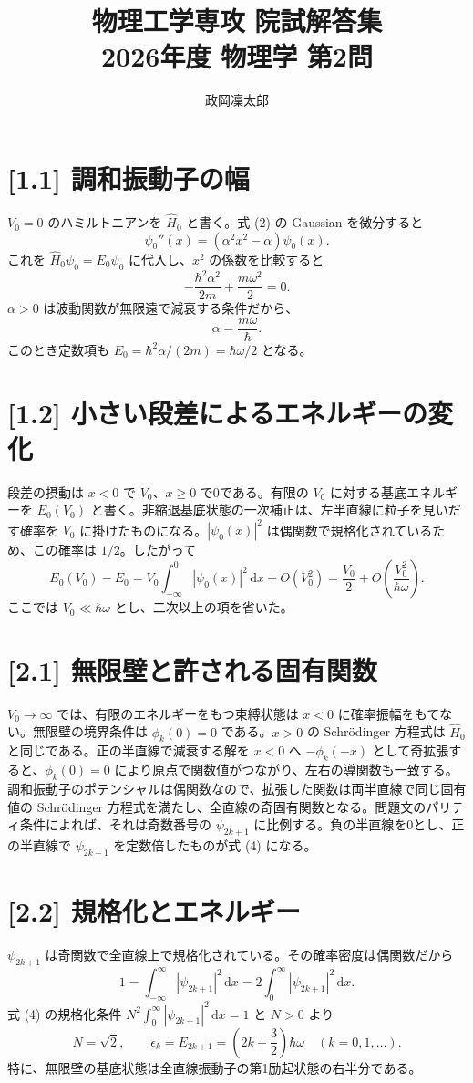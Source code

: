 \documentclass[11pt,a4paper]{article}
\title{物理工学専攻 院試解答集\\2026年度 物理学 第2問}
\author{政岡凜太郎}
\date{}
\begin{document}
\maketitle

\section*{[1.1] 調和振動子の幅}
$V_0=0$ のハミルトニアンを $\hat H_0$ と書く。式 (2) の Gaussian を微分すると
\[
\psi_0''(x)=(\alpha^2x^2-\alpha)\psi_0(x).
\]
これを $\hat H_0\psi_0=E_0\psi_0$ に代入し、$x^2$ の係数を比較すると
\[
-\frac{\hbar^2\alpha^2}{2m}+\frac{m\omega^2}{2}=0.
\]
$\alpha>0$ は波動関数が無限遠で減衰する条件だから、
\[
\boxed{\alpha=\frac{m\omega}{\hbar}}.
\]
このとき定数項も $E_0=\hbar^2\alpha/(2m)=\hbar\omega/2$ となる。

\section*{[1.2] 小さい段差によるエネルギーの変化}
段差の摂動は $x<0$ で $V_0$、$x\geq0$ で0である。有限の $V_0$ に対する基底エネルギーを $E_0(V_0)$ と書く。非縮退基底状態の一次補正は、左半直線に粒子を見いだす確率を $V_0$ に掛けたものになる。$|\psi_0(x)|^2$ は偶関数で規格化されているため、この確率は $1/2$。したがって
\[
\boxed{E_0(V_0)-E_0
=V_0\int_{-\infty}^{0}|\psi_0(x)|^2\,\mathrm dx+O(V_0^2)
=\frac{V_0}{2}+O\!\left(\frac{V_0^2}{\hbar\omega}\right)}.
\]
ここでは $V_0\ll\hbar\omega$ とし、二次以上の項を省いた。

\section*{[2.1] 無限壁と許される固有関数}
$V_0\to\infty$ では、有限のエネルギーをもつ束縛状態は $x<0$ に確率振幅をもてない。無限壁の境界条件は $\phi_k(0)=0$ である。$x>0$ の Schrödinger 方程式は $\hat H_0$ と同じである。正の半直線で減衰する解を $x<0$ へ $-\phi_k(-x)$ として奇拡張すると、$\phi_k(0)=0$ により原点で関数値がつながり、左右の導関数も一致する。調和振動子のポテンシャルは偶関数なので、拡張した関数は両半直線で同じ固有値の Schrödinger 方程式を満たし、全直線の奇固有関数となる。問題文のパリティ条件によれば、それは奇数番号の $\psi_{2k+1}$ に比例する。負の半直線を0とし、正の半直線で $\psi_{2k+1}$ を定数倍したものが式 (4) になる。

\section*{[2.2] 規格化とエネルギー}
$\psi_{2k+1}$ は奇関数で全直線上で規格化されている。その確率密度は偶関数だから
\[
1=\int_{-\infty}^{\infty}|\psi_{2k+1}|^2\,\mathrm dx
=2\int_0^{\infty}|\psi_{2k+1}|^2\,\mathrm dx.
\]
式 (4) の規格化条件 $N^2\int_0^\infty|\psi_{2k+1}|^2\,\mathrm dx=1$ と $N>0$ より
\[
\boxed{N=\sqrt2},\qquad
\boxed{\epsilon_k=E_{2k+1}=\left(2k+\frac32\right)\hbar\omega}
\quad(k=0,1,\ldots).
\]
特に、無限壁の基底状態は全直線振動子の第1励起状態の右半分である。
\end{document}
